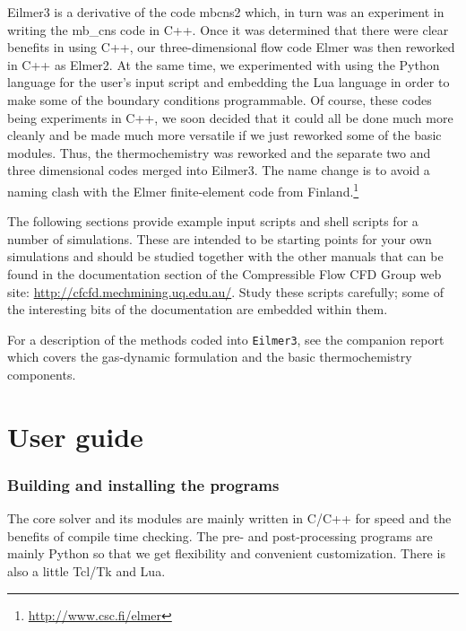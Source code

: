 \documentclass[12pt,a4paper,twoside]{article}
\begin{document}
\medskip
Eilmer3 is a derivative of the code mbcns2 which, in turn was an experiment in writing
the mb\_cns code in C++.
Once it was determined that there were clear benefits in using C++,
our three-dimensional flow code Elmer was then reworked in C++ as Elmer2.
At the same time, we experimented with using the Python language for the user's input script and 
embedding the Lua language in order to make some of the boundary conditions programmable.
Of course, these codes being experiments in C++, we soon decided that it could all be done
much more cleanly and be made much more versatile if we just reworked some of the basic modules.
Thus, the thermochemistry was reworked and the separate two and three dimensional codes merged
into Eilmer3.
The name change is to avoid a naming clash with the Elmer finite-element code 
from Finland.\footnote{\url{http://www.csc.fi/elmer}}

\medskip 
The following sections provide example input scripts and shell scripts for a number of simulations.
These are intended to be starting points for your own simulations and should be studied together with 
the other manuals that can be found in the documentation section of the 
Compressible Flow CFD Group web site:  
\url{http://cfcfd.mechmining.uq.edu.au/}.
Study these scripts carefully; some of the interesting bits of the documentation are
embedded within them.

\medskip
For a description of the methods coded into \texttt{Eilmer3}, see the companion report \cite{jacobs_etal_2010b}
which covers the gas-dynamic formulation and the basic thermochemistry components.

\clearpage

\part{User guide}

\section{Building and installing the programs}
%
The core solver and its modules are mainly written in C/C++ for speed and the benefits of compile time checking. 
The pre- and post-processing programs are mainly Python so that we get flexibility and convenient customization.
There is also a little Tcl/Tk and Lua.
\end{document}
